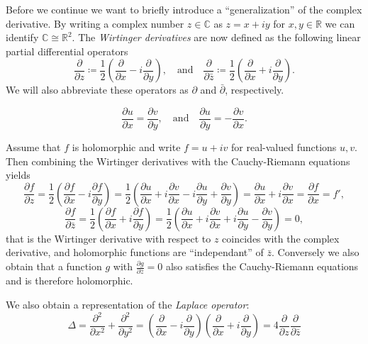 \documentclass[letterpaper, 11pt]{article}
\newcommand{\R}{\mathbb{R}}
\newcommand{\C}{\mathbb{C}}
\newcommand{\1}{\mathds{1}}
\theoremstyle{definition}
\begin{document}
Before we continue we want to briefly introduce a ``generalization'' of the complex derivative. By writing a complex number $z \in \C$ as $z = x + iy$ for $x, y \in \R$ we can identify $\C \cong \R^2$. The \emph{Wirtinger derivatives} are now defined as the following linear partial differential operators
\begin{equation*}
  \frac{\partial}{\partial z} \coloneqq \frac{1}{2} \left( \frac{\partial}{\partial x} - i \frac{\partial}{\partial y} \right), \quad \textrm{and} \quad
  \frac{\partial}{\partial \bar{z}} \coloneqq \frac{1}{2} \left( \frac{\partial}{\partial x} + i \frac{\partial}{\partial y} \right).
\end{equation*}
We will also abbreviate these operators as $\partial$ and $\bar{\partial}$, respectively.

\begin{equation*}
  \frac{\partial u}{\partial x} = \frac{\partial v}{\partial y}, \quad \textrm{and} \quad \frac{\partial u}{\partial y} = -\frac{\partial v}{\partial x}.
\end{equation*}

Assume that $f$ is holomorphic and write $f = u + iv$ for real-valued functions $u, v$. Then combining the Wirtinger derivatives with the Cauchy-Riemann equations yields
$$
  \frac{\partial f}{\partial z} = \frac{1}{2} \left( \frac{\partial f}{\partial x} - i \frac{\partial f}{\partial y} \right) = \frac{1}{2} \left( \frac{\partial u}{\partial x} + i\frac{\partial v}{\partial x} - i\frac{\partial u}{\partial y} + \frac{\partial v}{\partial y} \right) = \frac{\partial u}{\partial x} + i \frac{\partial v}{\partial x} = \frac{\partial f}{\partial x} = f',
$$
$$
  \frac{\partial f}{\partial \bar{z}} = \frac{1}{2} \left( \frac{\partial f}{\partial x} + i \frac{\partial f}{\partial y} \right) = \frac{1}{2} \left( \frac{\partial u}{\partial x} + i\frac{\partial v}{\partial x} + i\frac{\partial u}{\partial y} - \frac{\partial v}{\partial y} \right) = 0,
$$
that is the Wirtinger derivative with respect to $z$ coincides with the complex derivative, and holomorphic functions are ``independant'' of $\bar{z}$. Conversely we also obtain that a function $g$ with $\frac{\partial g}{\partial \bar{z}} = 0$ also satisfies the Cauchy-Riemann equations and is therefore holomorphic.

We also obtain a representation of the \emph{Laplace operator}:
$$
  \Delta = \frac{\partial^2}{\partial x^2} + \frac{\partial^2}{\partial y^2} = \left( \frac{\partial}{\partial x} - i \frac{\partial}{\partial y} \right) \left( \frac{\partial}{\partial x} + i \frac{\partial}{\partial y} \right) = 4 \frac{\partial}{\partial z} \frac{\partial}{\partial \bar{z}}
$$
\end{document}
